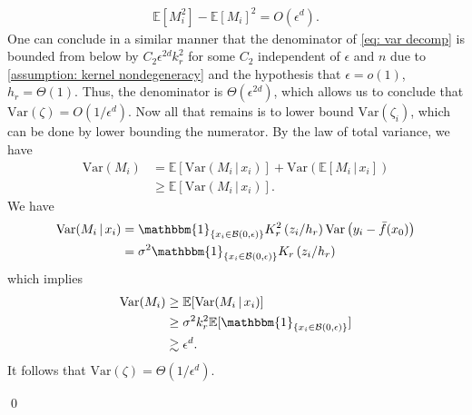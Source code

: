 \documentclass[11pt]{article}
\begin{document}
\begin{align}
    \mathbb{E}\left[M_i^2\right] - \mathbb{E}\left[M_i\right]^2 = O(\epsilon^d).
\end{align}
One can conclude in a similar manner that the denominator of \cref{eq: var decomp} is bounded from below by $C_2\epsilon^{2d}k_r^2$ for some $C_2$ independent of $\epsilon$ and $n$ due to \cref{assumption: kernel nondegeneracy} and the hypothesis that $\epsilon = o(1)$, $h_r = \Theta(1)$. Thus, the denominator is $\Theta(\epsilon^{2d})$, which allows us to conclude that $\text{Var}(\zeta) = O(1/\epsilon^{d})$. Now all that remains is to lower bound $\text{Var}(\zeta_i)$, which can be done by lower bounding the numerator. By the law of total variance, we have
\begin{align*}
    \text{Var}(M_i) &= \mathbb{E}[\text{Var}(M_i \,|\, x_i)] + \text{Var}(\mathbb{E}[M_i \,|\, x_i]) \\
    &\geq \mathbb{E}[\text{Var}(M_i \,|\, x_i)].
\end{align*}
We have
\begin{align*}
    \text{Var}(M_i \, |\, x_i) &= \mathbbm{1}_{\{x_i \in \mathcal{B}(0, \epsilon)\}}K_r^2\left(z_i/h_r \right) \text{Var}\left(y_i - \bar{f}(x_0)\right) \\
    &= \sigma^2 \mathbbm{1}_{\{x_i \in \mathcal{B}(0, \epsilon)\}}K_r\left(z_i/h_r \right)
\end{align*}
which implies 
\begin{align*}
    \text{Var}(M_i) &\geq \mathbb{E}[\text{Var}(M_i \,|\, x_i)] \\
    & \geq \sigma^2k_r^2\mathbb{E}[\mathbbm{1}_{\{x_i \in \mathcal{B}(0, \epsilon)\}}] \\
    &\gtrsim \epsilon^d.
\end{align*}
It follows that $\text{Var}(\zeta) = \Theta(1/\epsilon^d).$

\qed{}
\end{document}
